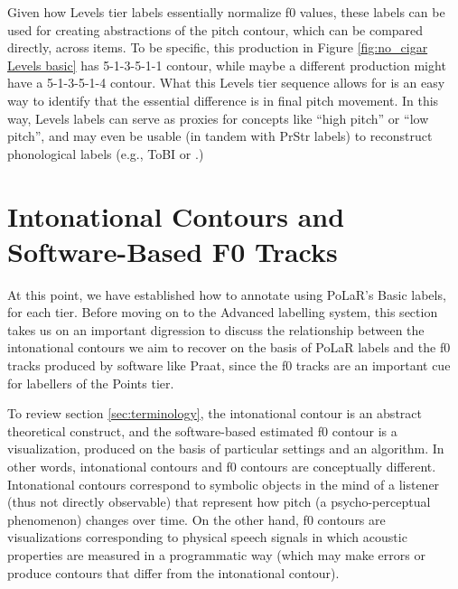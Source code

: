 \documentclass[11pt, twoside]{memoir}
\def\textlabel#1{{\relsize{-.5}\fontspec[Mapping=tex-text]{Roboto Mono}{#1}}}
\begin{document}
Given how Levels tier labels essentially normalize f0 values, these labels can be used for creating abstractions of the pitch contour, which can be compared directly, across items. To be specific, this production in Figure \ref{fig:no_cigar Levels basic} has 5-1-3-5-1-1 contour, while maybe a different production might have a 5-1-3-5-1-4 contour. What this Levels tier sequence allows for is an easy way to identify that the essential difference is in final pitch movement. In this way, Levels labels can serve as proxies for concepts like “high pitch” or “low pitch”, and may even be usable (in tandem with PrStr labels) to reconstruct phonological labels (e.g., ToBI \textlabel{H*} or \textlabel{H\%}.)

\section{Intonational Contours and Software-Based F0 Tracks}\label{sec:intonational-contours-and-software-based-pitch-tracks}

At this point, we have established how to annotate using PoLaR’s Basic labels, for each tier. Before moving on to the Advanced labelling system, this section takes us on an important digression to discuss the relationship between the intonational contours we aim to recover on the basis of PoLaR labels and the f0 tracks produced by software like Praat, since the f0 tracks are an important cue for labellers of the Points tier.

To review section \ref{sec:terminology}, the intonational contour is an abstract theoretical construct, and the software-based estimated f0 contour is a visualization, produced on the basis of particular settings and an algorithm. In other words, intonational contours and f0 contours are conceptually different. Intonational contours correspond to symbolic objects in the mind of a listener (thus not directly observable) that represent how pitch (a psycho-perceptual phenomenon) changes over time. On the other hand, f0 contours are visualizations corresponding to physical speech signals in which acoustic properties are measured in a programmatic way (which may make errors or produce contours that differ from the intonational contour).
\end{document}
